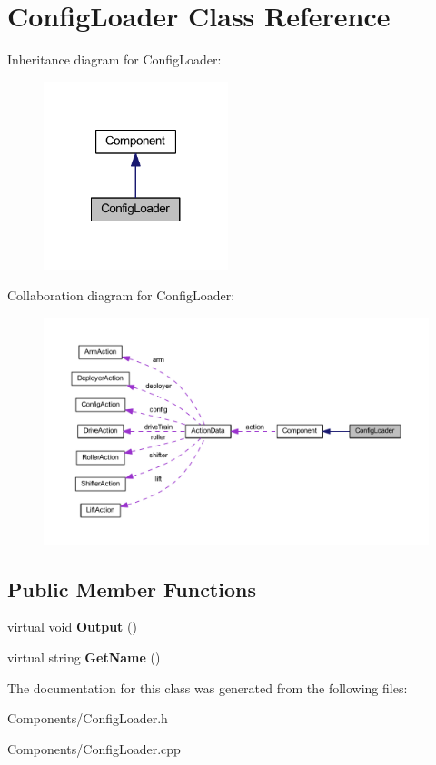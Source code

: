 \hypertarget{class_config_loader}{
\section{\-Config\-Loader \-Class \-Reference}
\label{class_config_loader}
}


\-Inheritance diagram for \-Config\-Loader\-:\nopagebreak
\begin{figure}[H]
\begin{center}
\leavevmode
\includegraphics[width=152pt]{class_config_loader__inherit__graph}
\end{center}
\end{figure}


\-Collaboration diagram for \-Config\-Loader\-:\nopagebreak
\begin{figure}[H]
\begin{center}
\leavevmode
\includegraphics[width=350pt]{class_config_loader__coll__graph}
\end{center}
\end{figure}
\subsection*{\-Public \-Member \-Functions}
\begin{DoxyCompactItemize}
\item 
\hypertarget{class_config_loader_a202db8d7509c10d7b085afa961f07b59}{
virtual void {\bfseries \-Output} ()}
\label{class_config_loader_a202db8d7509c10d7b085afa961f07b59}

\item 
\hypertarget{class_config_loader_abedfd1b6dd4b18bdc211bc6ba37e70f0}{
virtual string {\bfseries \-Get\-Name} ()}
\label{class_config_loader_abedfd1b6dd4b18bdc211bc6ba37e70f0}

\end{DoxyCompactItemize}


\-The documentation for this class was generated from the following files\-:\begin{DoxyCompactItemize}
\item 
\-Components/\-Config\-Loader.\-h\item 
\-Components/\-Config\-Loader.\-cpp\end{DoxyCompactItemize}
